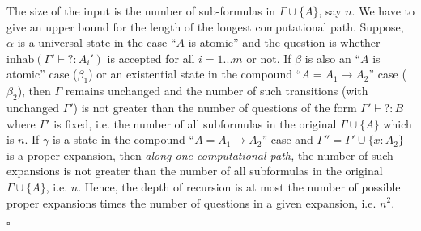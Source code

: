 \documentclass[12pt, titlepage, a4paper]{amsart}
\theoremstyle{definition}
\theoremstyle{theorem}
\theoremstyle{remark}
\begin{document}
The size of the input is the number of sub-formulas in $\Gamma\cup\{A\}$, say $n$. We have to give an upper bound for the length of the longest computational path. Suppose, $\alpha$ is a universal state in the case ``$A$ is atomic'' and the question is whether $\mathrm{inhab}(\Gamma'\vdash ?:A_i')$ is accepted for all $i=1...m$ or not. If $\beta$ is also an ``$A$ is atomic'' case ($\beta_1$) or an existential state in the compound ``$A=A_1\to A_2$'' case ($\beta_2$), then $\Gamma$ remains unchanged and the number of such transitions (with unchanged $\Gamma'$) is not greater than the number of questions of the form $\Gamma'\vdash ?:B$ where $\Gamma'$ is fixed, i.e. the number of all subformulas in the original $\Gamma\cup \{A\}$ which is $n$. If $\gamma$ is a state in the compound ``$A=A_1\to A_2$'' case and $\Gamma''=\Gamma'\cup\{x:A_2\}$ is a proper expansion, then \textit{along one computational path,} the number of such expansions is not greater than the number of all subformulas in the original $\Gamma\cup \{A\}$, i.e. $n$. Hence, the depth of recursion is at most the number of possible proper expansions times the number of questions in a given expansion, i.e. $n^2$.
\begin{center}
\end{center}
$\square$\\
\end{document}
